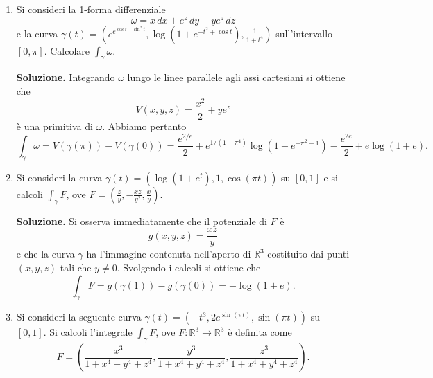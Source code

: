 \begin{enumerate}
		Per cui facendo tendere $\varepsilon \to 0$ si ottiene
		\[
		\lim_{\varepsilon \to 0} \int_{\left.\gamma\right|_{[\varepsilon, 2\pi - \varepsilon]}} \eta_0 = 2\pi.
		\]
		
		Una soluzione decisamente più veloce potrebbe essere la seguente: si noti che $\gamma(t) = f(t)(\cos t, \sin t)$, $f(t) > 0$ sull'intervallo considerato, fuorché in $t = 0$. Si calcola facilmente $\gamma'(t) = \left(f'(t)\cos t - f(t)\sin t, f'(t)\sin t + f(t)\cos t\right)$ e, se $t \neq 0$ e dunque $f(t) \neq 0$,
		\[
		\begin{aligned}
			\eta_0(\gamma(t)) \cdot \gamma'(t) &= -\frac{f(t)\sin t}{f(t)^2}\left(f'(t)\cos t - f(t)\sin t\right) + \\
			&\quad + \frac{f(t)\cos t}{f(t)^2}\left(f'(t)\sin t + f(t)\cos t\right) = 1.
		\end{aligned}
		\]
		Da ciò si ottiene immediatamente che
		\[
		\int_{\left.\gamma\right|_{[\varepsilon, 2\pi - \varepsilon]}} \eta_0 = 2\pi - 2\varepsilon
		\]
		e si conclude come prima.
	
	
	\item Si consideri la 1-forma differenziale
	\[
	\omega = x\,dx + e^z\,dy + y e^z\,dz
	\]
	e la curva $\gamma(t) = \left(e^{e^{\cos t - \sin^2 t}}, \log \left(1 + e^{-t^2 + \cos t}\right), \frac{1}{1 + t^4}\right)$ sull'intervallo $[0, \pi]$.
	Calcolare $\int_{\gamma} \omega$.
	
	\textbf{Soluzione.}
		Integrando $\omega$ lungo le linee parallele agli assi cartesiani si ottiene che
		\[
		V(x,y,z) = \frac{x^2}{2} + y e^z
		\]
		è una primitiva di $\omega$. Abbiamo pertanto
		\[
		\int_{\gamma} \omega = V(\gamma(\pi)) - V(\gamma(0)) = \frac{e^{2/e}}{2} + e^{1/(1+\pi^4)} \log \left(1 + e^{-\pi^2 - 1}\right) - \frac{e^{2e}}{2} + e \log (1 + e).
		\]
	
	
	\item Si consideri la curva $\gamma(t) = \left(\log (1 + e^t), 1, \cos (\pi t)\right)$ su $[0,1]$ e si calcoli $\int_{\gamma} F$, ove $F = \left(\frac{z}{y}, -\frac{xz}{y^2}, \frac{x}{y}\right)$.
	
	\textbf{Soluzione.}
		Si osserva immediatamente che il potenziale di $F$ è
		\[
		g(x,y,z) = \frac{xz}{y}
		\]
		e che la curva $\gamma$ ha l'immagine contenuta nell'aperto di $\mathbb{R}^3$ costituito dai punti $(x,y,z)$ tali che $y \neq 0$. Svolgendo i calcoli si ottiene che
		\[
		\int_{\gamma} F = g(\gamma(1)) - g(\gamma(0)) = -\log (1 + e).
		\]
	
	
	\item Si consideri la seguente curva $\gamma(t) = \left(-t^3, 2e^{\sin (\pi t)}, \sin (\pi t)\right)$ su $[0,1]$. Si calcoli l'integrale $\int_{\gamma} F$, ove $F: \mathbb{R}^3 \to \mathbb{R}^3$ è definita come
	\[
	F = \left(\frac{x^3}{1 + x^4 + y^4 + z^4}, \frac{y^3}{1 + x^4 + y^4 + z^4}, \frac{z^3}{1 + x^4 + y^4 + z^4}\right).
	\]
	

\end{enumerate}
